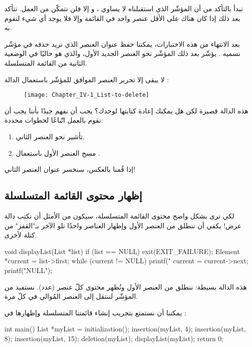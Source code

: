 نبدأ بالتأكد من أن المؤشّر الذي استقبلناه لا يساوي
،
و إلا فلن نتمكّن من العمل. نتأكد بعد ذلك إذا كان هناك على الأقل عنصر واحد في القائمة وإلا فلا يوجد أي شيء لنقوم به.

بعد الانتهاء من هذه الاختبارات، يمكننا حفظ عنوان العنصر الذي نريد حذفه في مؤشّر نسميه
.
يؤشّر بعد ذلك المؤشّر
نحو العنصر الجديد الأول، والذي هو حاليًا في الوضعية الثانية من القائمة المتسلسلة.

لا يبقى إلا تحرير العنصر الموافق للمؤشّر 
باستعمال الدالة
:

\begin{figure}[H]
	\centering
	\texttt{[image: Chapter\_IV-1\_List-to-delete]}
\end{figure}

هذه الدالة قصيرة لكن هل يمكنك إعادة كتابتها لوحدك؟ يجب أن نفهم جيدًا بأننا يجب أن نقوم بالعمل اتّباعًا لخطوات محددة:

\begin{enumerate}
	\item تأشير
	نحو العنصر الثاني.
	\item مسح العنصر الأول باستعمال 
	.
\end{enumerate}

إذا قُمنا بالعكس، سنخسر عنوان العنصر الثاني!

\subsection{إظهار محتوى القائمة المتسلسلة}

لكي نرى بشكل واضح محتوى القائمة المتسلسلة، سيكون من الأمثل أن نكتب دالة عرض! يكفي أن ننطلق من العنصر الأول وإظهار العناصر واحدًا تلو الآخر بـ"القفز" من كتلة لأخرى.

\begin{Csource}
void displayList(List *list)
{
	if (list == NULL)
	{
		exit(EXIT_FAILURE);
	}
	Element *current = list->first;
	while (current != NULL)
	{
		printf("%
		current = current->next;
	}
	printf("NULL\n");
}
\end{Csource}

هذه الدالة بسيطة: ننطلق من العنصر الأول ونُظهر محتوى كلّ عنصر (عدد). نستفيد من المؤشّر 
لننتقل إلى العنصر المُوالي في كلّ مرة.

يمكننا أن نستمتع بتجريب إنشاء قائمتنا المتسلسلة وإظهارها في
:

\begin{Csource}
int main()
{
	List *myList = initialization();
	insertion(myList, 4);
	insertion(myList, 8);
	insertion(myList, 15);
	deletion(myList);
	displayList(myList);
	return 0;
}
\end{Csource}

